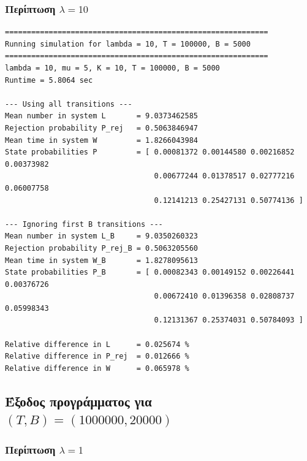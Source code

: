 \documentclass{article}
\begin{document}
\subsubsection*{Περίπτωση $\lambda = 10$}

{
\begin{verbatim}
============================================================
Running simulation for lambda = 10, T = 100000, B = 5000
============================================================
lambda = 10, mu = 5, K = 10, T = 100000, B = 5000
Runtime = 5.8064 sec

--- Using all transitions ---
Mean number in system L       = 9.0373462585
Rejection probability P_rej   = 0.5063846947
Mean time in system W         = 1.8266043984
State probabilities P         = [ 0.00081372 0.00144580 0.00216852 0.00373982
                                  0.00677244 0.01378517 0.02777216 0.06007758
                                  0.12141213 0.25427131 0.50774136 ]

--- Ignoring first B transitions ---
Mean number in system L_B     = 9.0350260323
Rejection probability P_rej_B = 0.5063205560
Mean time in system W_B       = 1.8278095613
State probabilities P_B       = [ 0.00082343 0.00149152 0.00226441 0.00376726
                                  0.00672410 0.01396358 0.02808737 0.05998343
                                  0.12131367 0.25374031 0.50784093 ]

Relative difference in L      = 0.025674 %
Relative difference in P_rej  = 0.012666 %
Relative difference in W      = 0.065978 %
\end{verbatim}
}

\subsection{Έξοδος προγράμματος για $(T,B) = (1000000,20000)$}

\subsubsection*{Περίπτωση $\lambda = 1$}
\end{document}
